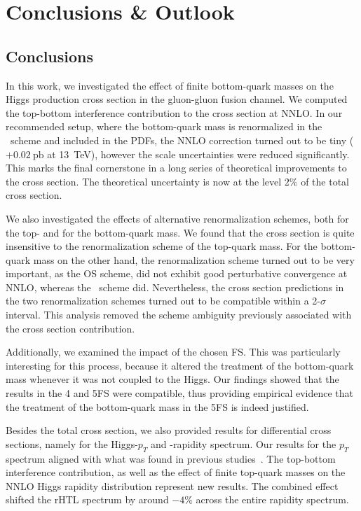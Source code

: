 

\chapter{Conclusions \& Outlook}\label{chap:seven}
\section{Conclusions}
In this work, we investigated the effect of finite bottom-quark masses on the Higgs production cross section in the gluon-gluon fusion channel. We computed the top-bottom interference contribution to the cross section at \acs{NNLO}. In our recommended setup, where the bottom-quark mass is renormalized in the \MS\ scheme and included in the \acs{PDF}s, the \acs{NNLO} correction turned out to be tiny ($+0.02\ \mathrm{pb}$ at 13~TeV), however the scale uncertainties were reduced significantly. This marks the final cornerstone in a long series of theoretical improvements to the cross section. The theoretical uncertainty is now at the level $2\%$ of the total cross section.

We also investigated the effects of alternative renormalization schemes, both for the top- and for the bottom-quark mass. We found that the cross section is quite insensitive to the renormalization scheme of the top-quark mass. For the bottom-quark mass on the other hand, the renormalization scheme turned out to be very important, as the \acs{OS} scheme, did not exhibit good perturbative convergence at \acs{NNLO}, whereas the \MS\ scheme did. Nevertheless, the cross section predictions in the two renormalization schemes turned out to be compatible within a 2-$\sigma$ interval. This analysis removed the scheme ambiguity previously associated with the cross section contribution.

Additionally, we examined the impact of the chosen \acs{FS}. This was particularly interesting for this process, because it altered the treatment of the bottom-quark mass whenever it was not coupled to the Higgs. Our findings showed that the results in the 4 and 5\acs{FS} were compatible, thus providing empirical evidence that the treatment of the bottom-quark mass in the 5\acs{FS} is indeed justified.

Besides the total cross section, we also provided results for differential cross sections, namely for the Higgs-$p_T$ and -rapidity spectrum. Our results for the $p_T$ spectrum aligned with what was found in previous studies~\cite{Caola:2018zye,Bonciani:2022jmb}. The top-bottom interference contribution, as well as the effect of finite top-quark masses on the \acs{NNLO} Higgs rapidity distribution represent new results. The combined effect shifted the \acs{rHTL} spectrum by around $-4\%$ across the entire rapidity spectrum.

